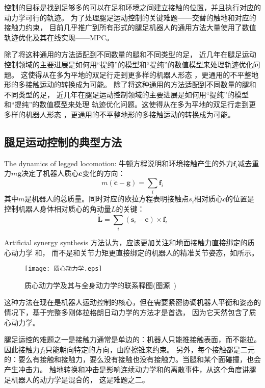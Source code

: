 控制的目标是找到足够多的可以在足和环境之间建立接触的位置，并且执行对应的动力学可行的轨迹。
为了处理腿足运动控制的关键难题——交替的触地和对应的接触力约束，
目前几乎推广到所有形式的腿足机器人的通用方法大量使用了数值轨迹优化及其在线实现——MPC。

除了将这种通用的方法适配到不同数量的腿和不同类型的足，
近几年在腿足运动控制领域的主要进展是如何用“提纯”的模型和“提纯”的数值模型来处理轨迹优化问题。
这使得从在多为平地的双足行走到更多样的机器人形态
，更通用的不平整地形的多接触运动的转换成为可能。
除了将这种通用的方法适配到不同数量的腿和不同类型的足，
近几年在腿足运动控制领域的主要进展是如何用“提纯”的模型和“提纯”的数值模型来处理
轨迹优化问题。这使得从在多为平地的双足行走到更多样的机器人形态
，更通用的不平整地形的多接触运动的转换成为可能。

\subsection{腿足运动控制的典型方法}
The dynamics of legged locomotion: 牛顿方程说明和环境接触产生的外力$\boldsymbol{f}_i$减去重力$m\boldsymbol{g}$决定了机器人质心$\boldsymbol{c}$变化的方向：
\begin{equation}
    \label{equ:newton}
    m(\ddot{\boldsymbol{c}}-\boldsymbol{g})=\sum_i \boldsymbol{f}_i
\end{equation}
其中$m$是机器人的总质量。同时对应的欧拉方程表明接触点$s_i$相对质心$c$的位置是控制机器人身体相对质心的角动量$L$的关键：
\begin{equation}
    \label{equ:euler}
    \dot{\boldsymbol{L}}=\sum_i\left(\boldsymbol{s}_i-\boldsymbol{c}\right) \times \boldsymbol{f}_i
\end{equation}

Artificial synergy synthesis 方法认为，应该更加关注和地面接触力直接绑定的质心动力学
和，
而不是和关节力矩更直接绑定的机器人的精准关节姿态\cite{vukobratovic1972contribution}，如所示。
\begin{figure}[htbp]
    \centering
    \texttt{[image: 质心动力学.eps]}
    \caption{\label{fig:centroid}质心动力学及其与全身动力学的联系释图(图源~\cite{carpentier2016center})}
\end{figure}
这种方法在现在是机器人运动控制的核心，但在需要紧密协调机器人平衡和姿态的情况下，基于完整多刚体拉格朗日动力学的方法才是首选，
因为它天然包含了质心动力学\cite{orin2013centroidal}。

腿足运控的难题之一是接触力通常是单边的：机器人只能推接触表面，而不能拉。因此接触力$f_i$只能朝向特定的方向，由摩擦锥来约束。
另外，每个接触都是二元的：要么有接触和接触力，要么没有接触也没有接触力。当腿和某个面碰撞，也会产生冲击力。
触地转换和冲击是影响连续动力学和的离散事件，从这个角度讲腿足机器人的动力学是混合的，
这是难题之二。

